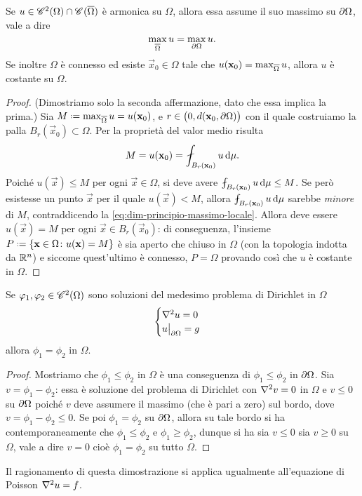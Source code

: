 \begin{teorema} \label{t:principio-massimo-laplace}
    Se $u\in\cont[2]{\Omega}\cap\cont{\clos{\Omega}}$ è armonica su $\Omega$, allora essa assume il suo massimo su $\boundary\Omega$, vale a dire
    \begin{equation}
        \max_{\clos{\Omega}}u=\max_{\boundary\Omega}u.
    \end{equation}
    Se inoltre $\Omega$ è connesso ed esiste $\vec x_0\in\Omega$ tale che $u(\vec x_0)=\max_{\clos{\Omega}}u$, allora $u$ è costante su $\Omega$.
\end{teorema}
\begin{proof}
    (Dimostriamo solo la seconda affermazione, dato che essa implica la prima.)
    Sia $M\defeq\max_{\clos{\Omega}}u=u(\vec x_0)$, e $r\in\bigl(0,d(\vec x_0,\boundary\Omega)\bigr)$ con il quale costruiamo la palla $B_r(\vec x_0)\subset\Omega$.
    Per la proprietà del valor medio risulta
    \begin{equation}
        M=u(\vec x_0)=\avint_{B_r(\vec x_0)}u\,\dd\mu.
        \label{eq:dim-principio-massimo-locale}
    \end{equation}
    Poich\'e $u(\vec x)\le M$ per ogni $\vec x\in\Omega$, si deve avere $\avint_{B_r(\vec x_0)}u\,\dd\mu\le M$.
    Se però esistesse un punto $\vec x$ per il quale $u(\vec x)<M$, allora $\avint_{B_r(\vec x_0)}u\,\dd\mu$ sarebbe \emph{minore} di $M$, contraddicendo la \eqref{eq:dim-principio-massimo-locale}.
    Allora deve essere $u(\vec x)=M$ per ogni $\vec x\in B_r(\vec x_0)$: di conseguenza, l'insieme $P\defeq\{\vec x\in\Omega\colon u(\vec x)=M\}$ è sia aperto che chiuso in $\Omega$ (con la topologia indotta da $\R^n$) e siccome quest'ultimo è connesso, $P=\Omega$ provando cos\`i che $u$ è costante in $\Omega$.
\end{proof}

\begin{teorema} \label{t:unicità-problema-dirichlet-laplace}
    Se $\phi_1,\phi_2\in\cont[2]{\Omega}$ sono soluzioni del medesimo problema di Dirichlet in $\Omega$
    \begin{equation}
        \begin{cases}
            \lap u=0 \\
            u\bigr|_{\boundary\Omega}=g
        \end{cases}
    \end{equation}
    allora $\phi_1=\phi_2$ in $\Omega$.
\end{teorema}
\begin{proof}
    Mostriamo che $\phi_1\le\phi_2$ in $\Omega$ è una conseguenza di $\phi_1\le\phi_2$ in $\boundary\Omega$.
    Sia $v=\phi_1-\phi_2$: essa è soluzione del problema di Dirichlet con $\lap v=0$ in $\Omega$ e $v\le 0$ su $\boundary\Omega$ poich\'e $v$ deve assumere il massimo (che è pari a zero) sul bordo, dove $v=\phi_1-\phi_2\le 0$.
    Se poi $\phi_1=\phi_2$ su $\boundary\Omega$, allora su tale bordo si ha contemporaneamente che $\phi_1\le\phi_2$ e $\phi_1\ge\phi_2$, dunque si ha sia $v\le 0$ sia $v\ge 0$ su $\Omega$, vale a dire $v=0$ cioè $\phi_1=\phi_2$ su tutto $\Omega$.
\end{proof}
Il ragionamento di questa dimostrazione si applica ugualmente all'equazione di Poisson $\lap u=f$.
